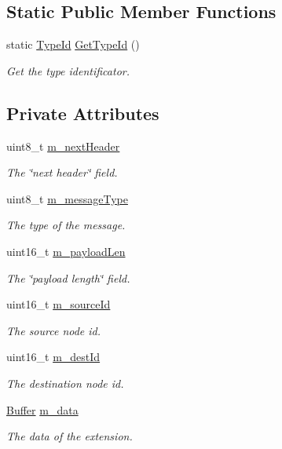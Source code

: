\subsection*{Static Public Member Functions}
\begin{DoxyCompactItemize}
\item 
static \hyperlink{classns3_1_1TypeId}{Type\+Id} \hyperlink{classns3_1_1dsr_1_1DsrFsHeader_a41685b2c53a6ee31b871d8cdde71d770}{Get\+Type\+Id} ()
\begin{DoxyCompactList}\small\item\em Get the type identificator. \end{DoxyCompactList}\end{DoxyCompactItemize}
\subsection*{Private Attributes}
\begin{DoxyCompactItemize}
\item 
uint8\+\_\+t \hyperlink{classns3_1_1dsr_1_1DsrFsHeader_ad8aa1ce25a4d8d8d994351fffd51dac1}{m\+\_\+next\+Header}
\begin{DoxyCompactList}\small\item\em The \char`\"{}next header\char`\"{} field. \end{DoxyCompactList}\item 
uint8\+\_\+t \hyperlink{classns3_1_1dsr_1_1DsrFsHeader_a86fd12b9ad8f826549447d2257c2961e}{m\+\_\+message\+Type}
\begin{DoxyCompactList}\small\item\em The type of the message. \end{DoxyCompactList}\item 
uint16\+\_\+t \hyperlink{classns3_1_1dsr_1_1DsrFsHeader_a9dc07aa5b9440cc15d2b99b5f6c57037}{m\+\_\+payload\+Len}
\begin{DoxyCompactList}\small\item\em The \char`\"{}payload length\char`\"{} field. \end{DoxyCompactList}\item 
uint16\+\_\+t \hyperlink{classns3_1_1dsr_1_1DsrFsHeader_a6906146cac69c891c9c54a722dc8b36a}{m\+\_\+source\+Id}
\begin{DoxyCompactList}\small\item\em The source node id. \end{DoxyCompactList}\item 
uint16\+\_\+t \hyperlink{classns3_1_1dsr_1_1DsrFsHeader_a4b5e5ccb8af3e9a246e31c9393ed7036}{m\+\_\+dest\+Id}
\begin{DoxyCompactList}\small\item\em The destination node id. \end{DoxyCompactList}\item 
\hyperlink{classns3_1_1Buffer}{Buffer} \hyperlink{classns3_1_1dsr_1_1DsrFsHeader_af0510de35218eebeefe1122593612475}{m\+\_\+data}
\begin{DoxyCompactList}\small\item\em The data of the extension. \end{DoxyCompactList}\end{DoxyCompactItemize}
